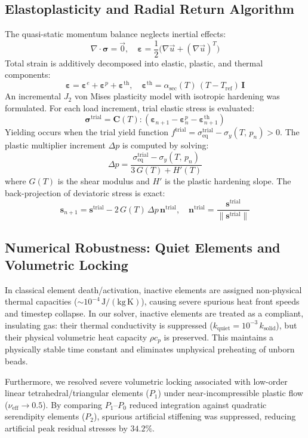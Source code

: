 \documentclass[10pt,a4paper]{article}
\begin{document}
\subsection{Elastoplasticity and Radial Return Algorithm}
The quasi-static momentum balance neglects inertial effects:
\[
\nabla \cdot \boldsymbol{\sigma} = \vec{0}, \quad \boldsymbol{\varepsilon} = \frac{1}{2}\bigl(\nabla \vec{u} + (\nabla \vec{u})^T\bigr)
\]
Total strain is additively decomposed into elastic, plastic, and thermal components:
\[
\boldsymbol{\varepsilon} = \boldsymbol{\varepsilon}^e + \boldsymbol{\varepsilon}^p + \boldsymbol{\varepsilon}^{\mathrm{th}}, \quad \boldsymbol{\varepsilon}^{\mathrm{th}} = \alpha_{\mathrm{sec}}(T)\,(T - T_{\mathrm{ref}})\,\mathbf{I}
\]
An incremental \(J_2\) von Mises plasticity model with isotropic hardening was formulated. For each load increment, trial elastic stress is evaluated:
\[
\boldsymbol{\sigma}^{\mathrm{trial}} = \mathbf{C}(T) : (\boldsymbol{\varepsilon}_{n+1} - \boldsymbol{\varepsilon}^p_n - \boldsymbol{\varepsilon}^{\mathrm{th}}_{n+1})
\]
Yielding occurs when the trial yield function \(f^{\mathrm{trial}} = \sigma_{\mathrm{eq}}^{\mathrm{trial}} - \sigma_y(T,\,p_n) > 0\). The plastic multiplier increment \(\Delta p\) is computed by solving:
\[
\Delta p = \frac{\sigma_{\mathrm{eq}}^{\mathrm{trial}} - \sigma_y(T,\,p_n)}{3\,G(T) + H'(T)}
\]
where \(G(T)\) is the shear modulus and \(H'\) is the plastic hardening slope. The back-projection of deviatoric stress is exact:
\[
\mathbf{s}_{n+1} = \mathbf{s}^{\mathrm{trial}} - 2\,G(T)\,\Delta p\,\mathbf{n}^{\mathrm{trial}}, \quad \mathbf{n}^{\mathrm{trial}} = \frac{\mathbf{s}^{\mathrm{trial}}}{\|\mathbf{s}^{\mathrm{trial}}\|}
\]

\subsection{Numerical Robustness: Quiet Elements and Volumetric Locking}
In classical element death/activation, inactive elements are assigned non-physical thermal capacities (\(\sim 10^{-4}\,\mathrm{J/(kg\,K)}\)), causing severe spurious heat front speeds and timestep collapse. In our solver, inactive elements are treated as a compliant, insulating gas: their thermal conductivity is suppressed (\(k_{\mathrm{quiet}} = 10^{-3}\,k_{\mathrm{solid}}\)), but their physical volumetric heat capacity \(\rho c_p\) is preserved. This maintains a physically stable time constant and eliminates unphysical preheating of unborn beads.

Furthermore, we resolved severe volumetric locking associated with low-order linear tetrahedral/triangular elements (\(P_1\)) under near-incompressible plastic flow (\(\nu_{\mathrm{eff}} \to 0.5\)). By comparing \(P_1\text{--}P_0\) reduced integration against quadratic serendipity elements (\(P_2\)), spurious artificial stiffening was suppressed, reducing artificial peak residual stresses by \(34.2\%\).
\end{document}
